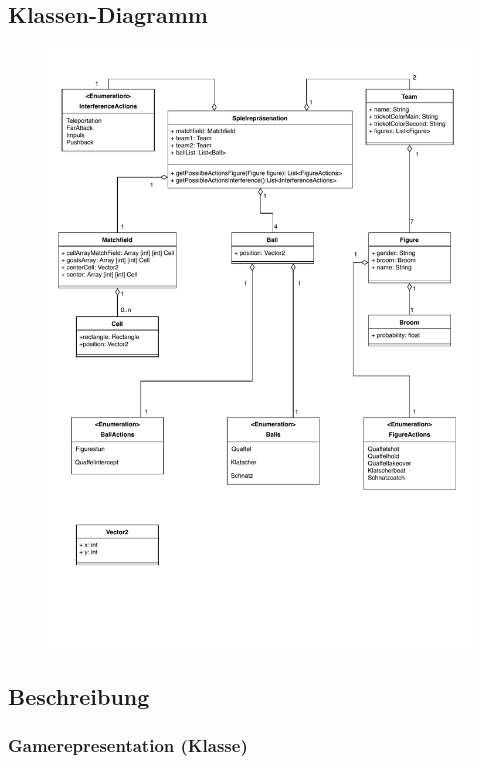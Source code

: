 \subsection{Klassen-Diagramm}
	\begin{figure}[H]
        \centering
        \includegraphics[scale=0.7]{images/model.pdf}
    \end{figure}

\subsection{Beschreibung}
	\subsubsection{Gamerepresentation (Klasse)}
	
